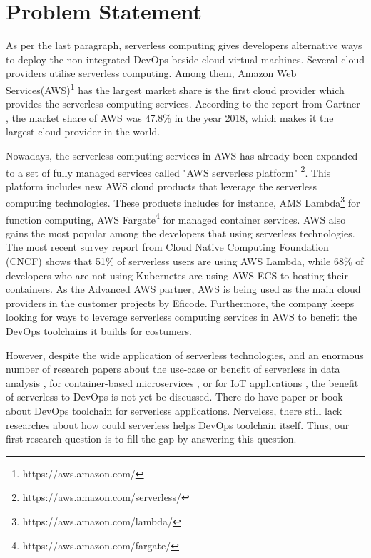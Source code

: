 \section{Problem Statement}
As per the last paragraph, serverless computing gives developers alternative ways to deploy the non-integrated DevOps beside cloud virtual machines. Several cloud providers utilise serverless computing. Among them, Amazon Web Services(AWS)\footnote{https://aws.amazon.com/} has the largest market share is the first cloud provider which provides the serverless computing services. According to the report from Gartner \cite{GartnerS47:online}, the market share of AWS was 47.8\% in the year 2018, which makes it the largest cloud provider in the world.
\par
Nowadays, the serverless computing services in AWS has already been expanded to a set of fully managed services called "AWS serverless platform" \footnote{https://aws.amazon.com/serverless/}. This platform includes new AWS cloud products that leverage the serverless computing technologies. These products includes for instance, AMS Lambda\footnote{https://aws.amazon.com/lambda/} for function computing, AWS Fargate\footnote{https://aws.amazon.com/fargate/} for managed container services.
AWS also gains the most popular among the developers that using serverless technologies. The most recent survey report \cite{cncf2020} from Cloud Native Computing Foundation (CNCF) shows that 51\% of serverless users are using AWS Lambda, while 68\% of developers who are not using Kubernetes are using AWS ECS to hosting their containers.
As the Advanced AWS partner, AWS is being used as the main cloud providers in the customer projects by Eficode. Furthermore, the company keeps looking for ways to leverage serverless computing services in AWS to benefit the DevOps toolchains it builds for costumers.
\par
However, despite the wide application of serverless technologies, and an enormous number of research papers about the use-case or benefit of serverless in data analysis \cite{8457831}, for container-based microservices \cite{perez2018serverless}, or for IoT applications \cite{nastic2017serverless} \cite{glikson2017deviceless}, the benefit of serverless to DevOps is not yet be discussed. There do have paper \cite{ivanov2018implementation} or book \cite{bangera2018devops} about DevOps toolchain for serverless applications. Nerveless, there still lack researches about how could serverless helps DevOps toolchain itself. Thus, our first research question is to fill the gap by answering this question. 
